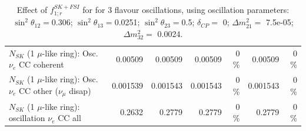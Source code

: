 \begin{table}
\begin{tabular}{| l | r | r | r  r | r  r |}
                          $N_{SK}$ (1 $\mu$-like ring): Osc. $\nu_e$ CC coherent &         0.00509 &         0.00509 &         0.00509 &        0 \%  &         0.00509 &        0 \%  \\ 
           $N_{SK}$ (1 $\mu$-like ring): Osc. $\nu_e$ CC other ($\nu_\mu$ disap) &        0.001539 &        0.001543 &        0.001543 &        0 \%  &        0.001543 &        0 \%  \\ 
                        $N_{SK}$ (1 $\mu$-like ring): oscillation $\nu_e$ CC all &          0.2632 &          0.2779 &          0.2779 &        0 \%  &          0.2779 &        0 \%  \\ 
\hline
\hline
\end{tabular}
\caption{ Effect of $f_{1; r}^{SK+FSI}$ for for 3 flavour oscillations, using oscillation parameters:  $\sin^2\theta_{12} = $0.306; $\sin^2\theta_{13} = $0.0251; $\sin^2\theta_{23} = $0.5; $\delta_{CP} = $        0; $\Delta m^2_{21} = $    7.5e-05; $\Delta m^2_{32} = $    0.0024. }
\label{tab:num_skdetfsi_001_1RmuT_3f_osc_t13:0.0251_spectralreco_spectraltrue}
\end{table}
\clearpage
